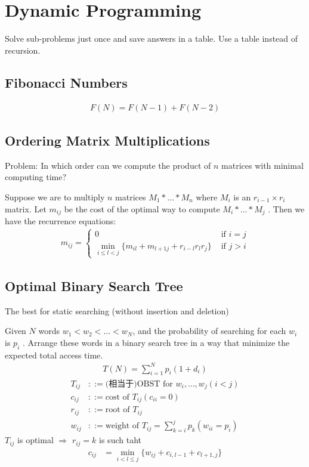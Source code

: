 \newpage
\section{Dynamic Programming}
Solve sub-problems just once and save answers in a table. Use a table instead of recursion.

\subsection{Fibonacci Numbers}
\begin{align*}
    F(N)=F(N-1)+F(N-2)
\end{align*}

\subsection{Ordering Matrix Multiplications}
Problem:  In which order can we compute the product of $n$ matrices with minimal computing time?

Suppose we are to multiply  $n$  matrices  $M_1*\dots*M_n$  where  $M_i$  is an $r_{i-1}\times r_i$ matrix.  Let $m_{ij}$ be the cost of the optimal way to compute  $M_i*\dots*M_j$ .  Then we have the recurrence equations:
\begin{align*}
    m_{ij}=\left\{ \begin{array}{ll}
        0 & \text{ if }i=j\\
        \min_{i\le l <j}\{ m_{il}+m_{l+1j}+r_{i-l}r_l r_j \} & \text{ if }j>i
    \end{array} \right.
\end{align*}

\subsection{Optimal Binary Search Tree}
The best for static searching (without insertion and deletion)

Given  $N$  words  $w_1 < w_2 < \dots < w_N$, and the probability of searching for each  $w_i$  is  $p_i$ .  Arrange these words in a binary search tree in a way that minimize the expected total access time.
\begin{align*}
    T(N)=\sum_{i=1}^N p_i(1+d_i)
\end{align*}
\begin{align*}
    T_{ij}&::=\text{(相当于)}\text{OBST for }w_i,\dots,w_j(i<j)\\
    c_{ij}&::=\text{cost of }T_{ij}(c_{ii}=0)\\
    r_{ij}&::=\text{root of }T_{ij}\\
    w_{ij}&::=\text{weight of }T_{ij}=\sum_{k=i}^j p_k (w_{ii}=p_i)
\end{align*}
$T_{ij}$ is optimal $\Rightarrow$ $r_{ij}=k$ is such taht 
\begin{align*}
    c_{ij}&=\min_{i<l\le j}\{ w_{ij}+c_{i, l-1}+c_{l+1,j} \}
\end{align*}

